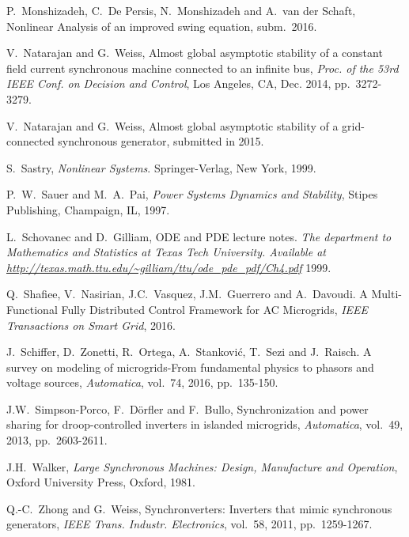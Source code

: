 \documentclass[letterpaper, 10 pt, conference]{ieeeconf}
\newcommand{\m}      {{\hbox{\hskip 1pt}}}
\begin{document}
\begin{thebibliography}{99}
 P.~Monshizadeh, C.~De Persis,
 N.~Monshizadeh and A.~van der Schaft, \m Nonlinear Analysis
 of an improved swing equation, \m subm.~2016.

 V.~Natarajan and G.~Weiss, \m Almost global 
 asymptotic stability of a constant field current synchronous 
 machine connected to an infinite bus, {\em Proc. of the 53rd 
 IEEE Conf. on Decision and Control}, Los Angeles, CA, Dec. 2014, 
 pp.~3272-3279.

 V.~Natarajan and G.~Weiss, \m Almost global 
 asymptotic stability of a grid-connected synchronous generator,
 submitted in 2015.

 S.~Sastry, \m \emph{Nonlinear Systems}.
 Springer-Verlag, New York, 1999.

 P.~W.~Sauer and M.~A.~Pai, \m {\em Power 
 Systems Dynamics and Stability}, Stipes Publishing, Champaign,
 IL, 1997.

 L.~Schovanec and D.~Gilliam, \m ODE
 and PDE lecture notes. {\em The department to Mathematics and 
 Statistics at Texas Tech University. Available at
 \url{http://texas.math.ttu.edu/~gilliam/ttu/ode_pde_pdf/Ch4.pdf} }
 \m 1999.
 
  Q.~Shafiee,  V.~Nasirian,  J.C.~Vasquez, J.M.~Guerrero and A.~Davoudi. \m A Multi-Functional Fully Distributed Control Framework for AC Microgrids, {\em 
 IEEE Transactions on Smart Grid}, 2016.

  J.~Schiffer, D.~Zonetti, R.~Ortega, A.~Stankovi{\'c},  T.~Sezi  and J.~Raisch. \m A survey on modeling of microgrids-From fundamental physics to phasors and voltage sources, {\em 
 Automatica}, vol.~74, 2016, pp.~135-150.

 J.W.~Simpson-Porco, F.~D{\"o}rfler
 and F.~Bullo, \m Synchronization and power sharing for
 droop-controlled inverters in islanded microgrids, {\em 
 Automatica}, vol.~49, 2013, pp.~2603-2611.

 J.H.~Walker, \m {\em Large Synchronous Machines: 
 Design, Manufacture and Operation}, \m Oxford University Press, 
 Oxford, 1981.

 Q.-C.~Zhong and G.~Weiss, \m Synchronverters: 
 Inverters that mimic synchronous generators, {\em IEEE Trans. 
 Industr. Electronics}, vol.~58, 2011, pp.~1259-1267.

\end{thebibliography}
\end{document}

